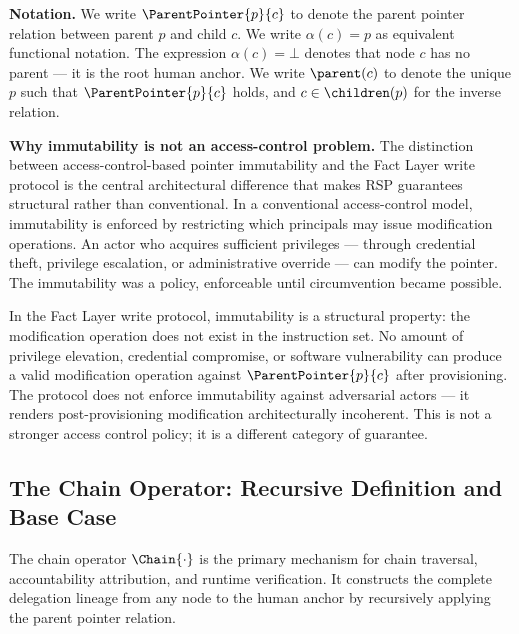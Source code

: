 \medskip
\noindent\textbf{Notation.} We write $\ParentPointer{p}{c}$ to denote the parent pointer relation between parent $p$ and child $c$. We write $\alpha(c) = p$ as equivalent functional notation. The expression $\alpha(c) = \bot$ denotes that node $c$ has no parent — it is the root human anchor. We write $\parent(c)$ to denote the unique $p$ such that $\ParentPointer{p}{c}$ holds, and $c \in \children(p)$ for the inverse relation.

\medskip
\noindent\textbf{Why immutability is not an access-control problem.} The distinction between access-control-based pointer immutability and the Fact Layer write protocol is the central architectural difference that makes RSP guarantees structural rather than conventional. In a conventional access-control model, immutability is enforced by restricting which principals may issue modification operations. An actor who acquires sufficient privileges — through credential theft, privilege escalation, or administrative override — can modify the pointer. The immutability was a policy, enforceable until circumvention became possible.

In the Fact Layer write protocol, immutability is a structural property: the modification operation does not exist in the instruction set. No amount of privilege elevation, credential compromise, or software vulnerability can produce a valid modification operation against $\ParentPointer{p}{c}$ after provisioning. The protocol does not enforce immutability against adversarial actors — it renders post-provisioning modification architecturally incoherent. This is not a stronger access control policy; it is a different category of guarantee.

\subsection{The Chain Operator: Recursive Definition and Base Case}
\label{sec:chain-operator}

The chain operator $\Chain{\cdot}$ is the primary mechanism for chain traversal, accountability attribution, and runtime verification. It constructs the complete delegation lineage from any node to the human anchor by recursively applying the parent pointer relation.

